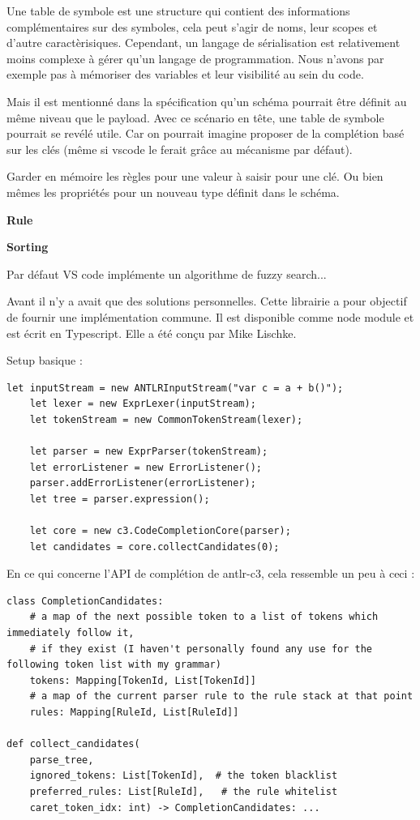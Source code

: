 \documentclass[
    iict, %
    il, %
]{heig-tb}
\begin{document}
Une table de symbole est une structure qui contient des informations complémentaires sur des symboles, cela peut s'agir de noms, leur scopes et d'autre caractèrisiques.
Cependant, un langage de sérialisation est relativement moins complexe à gérer qu'un langage de programmation.
Nous n'avons par exemple pas à mémoriser des variables et leur visibilité au sein du code.

Mais il est mentionné dans la spécification qu'un schéma pourrait être définit au même niveau que le payload.
Avec ce scénario en tête, une table de symbole pourrait se revélé utile.
Car on pourrait imagine proposer de la complétion basé sur les clés (même si vscode le ferait grâce au mécanisme par défaut). %

Garder en mémoire les règles pour une valeur à saisir pour une clé.
Ou bien mêmes les propriétés pour un nouveau type définit dans le schéma.


\textbf{Rule}


\textbf{Sorting}

Par défaut VS code implémente un algorithme de fuzzy search...

Avant il n'y a avait que des solutions personnelles. Cette librairie a pour objectif de fournir une implémentation commune. Il est disponible comme node module et est écrit en Typescript.
Elle a été conçu par Mike Lischke.

Setup basique :

\begin{lstlisting}[frame=single,caption={antlr-setup},label={antlr-setup}]
    let inputStream = new ANTLRInputStream("var c = a + b()");
    let lexer = new ExprLexer(inputStream);
    let tokenStream = new CommonTokenStream(lexer);

    let parser = new ExprParser(tokenStream);
    let errorListener = new ErrorListener();
    parser.addErrorListener(errorListener);
    let tree = parser.expression();

    let core = new c3.CodeCompletionCore(parser);
    let candidates = core.collectCandidates(0);
\end{lstlisting}

En ce qui concerne l'API de complétion de antlr-c3, cela ressemble un peu à ceci :

\begin{lstlisting}[frame=single]
class CompletionCandidates:
    # a map of the next possible token to a list of tokens which immediately follow it,
    # if they exist (I haven't personally found any use for the following token list with my grammar)
    tokens: Mapping[TokenId, List[TokenId]]
    # a map of the current parser rule to the rule stack at that point
    rules: Mapping[RuleId, List[RuleId]]

def collect_candidates(
    parse_tree,
    ignored_tokens: List[TokenId],  # the token blacklist
    preferred_rules: List[RuleId],   # the rule whitelist
    caret_token_idx: int) -> CompletionCandidates: ...
\end{lstlisting}
\end{document}
